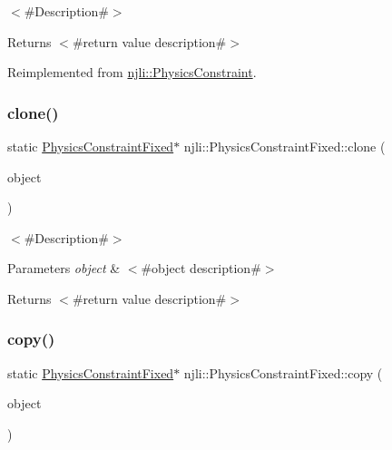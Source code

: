 $<$\#\+Description\#$>$

\begin{DoxyReturn}{Returns}
$<$\#return value description\#$>$ 
\end{DoxyReturn}


Reimplemented from \mbox{\hyperlink{classnjli_1_1_physics_constraint_aeda6c35ab271897cfe3192870d4ac7a4}{njli\+::\+Physics\+Constraint}}.

\mbox{\label{classnjli_1_1_physics_constraint_fixed_a842878b76d7f66ae80e7a9244b12d5a2}} 
\subsubsection{\texorpdfstring{clone()}{clone()}}
{\footnotesize\ttfamily static \mbox{\hyperlink{classnjli_1_1_physics_constraint_fixed}{Physics\+Constraint\+Fixed}}$\ast$ njli\+::\+Physics\+Constraint\+Fixed\+::clone (\begin{DoxyParamCaption}\item[{const \mbox{\hyperlink{classnjli_1_1_physics_constraint_fixed}{Physics\+Constraint\+Fixed}} \&}]{object }\end{DoxyParamCaption})\hspace{0.3cm}{\ttfamily [static]}}

$<$\#\+Description\#$>$


\begin{DoxyParams}{Parameters}
{\em object} & $<$\#object description\#$>$\\
\hline
\end{DoxyParams}
\begin{DoxyReturn}{Returns}
$<$\#return value description\#$>$ 
\end{DoxyReturn}
\mbox{\label{classnjli_1_1_physics_constraint_fixed_a3955cdd659159c1de1c7a015304e173e}} 
\subsubsection{\texorpdfstring{copy()}{copy()}}
{\footnotesize\ttfamily static \mbox{\hyperlink{classnjli_1_1_physics_constraint_fixed}{Physics\+Constraint\+Fixed}}$\ast$ njli\+::\+Physics\+Constraint\+Fixed\+::copy (\begin{DoxyParamCaption}\item[{const \mbox{\hyperlink{classnjli_1_1_physics_constraint_fixed}{Physics\+Constraint\+Fixed}} \&}]{object }\end{DoxyParamCaption})\hspace{0.3cm}{\ttfamily [static]}}

